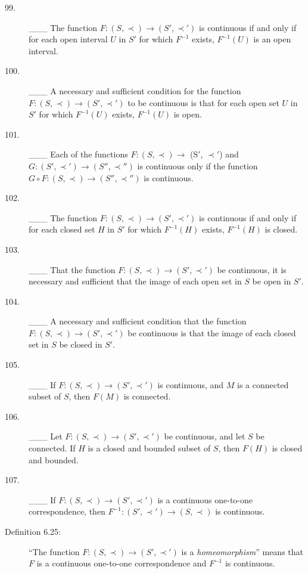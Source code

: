 \documentclass{book}
\begin{document}
\begin{description}
\item[99.] \_\_\_ The function $F: (S, \prec) \rightarrow (S', \prec ')$ is continuous if and only if for each open interval $U$ in $S'$ for which $F^{-1}$ exists, $F^{-1}(U)$ is an open interval.

\item[100.] \_\_\_ A necessary and sufficient condition for the function $F: (S, \prec) \rightarrow  (S', \prec ')$ to be continuous is that for each open set $U$ in $S'$ for which $F^{-1}(U)$ exists, $F^{-1}(U)$ is open.

\item[101.] \_\_\_ Each of the functions $F: (S, \prec) \rightarrow $ (S$'$, $\prec '$) and $G: (S', \prec ') \rightarrow (S'', \prec '')$ is continuous only if the function $G \circ F: (S, \prec) \rightarrow (S'', \prec '')$ is continuous.

\item[102.] \_\_\_ The function $F: (S, \prec) \rightarrow (S', \prec ')$ is continuous if and only if for each closed set $H$ in $S'$ for which $F^{-1}(H)$ exists, $F^{-1}(H)$ is closed.

\item[103.] \_\_\_ That the function $F: (S, \prec) \rightarrow (S', \prec ')$ be continuous, it is necessary and sufficient that the image of each open set in $S$ be open in $S'$.

\item[104.] \_\_\_ A necessary and sufficient condition that the function $F: (S, \prec) \rightarrow (S', \prec ')$ be continuous is that the image of each closed set in $S$ be closed in $S'$.

\item[105.] \_\_\_ If $F: (S, \prec) \rightarrow (S', \prec ')$ is continuous, and $M$ is a connected subset of $S$, then $F(M)$ is connected.

\item[106.] \_\_\_ Let $F: (S, \prec) \rightarrow (S', \prec ')$ be continuous, and let $S$ be connected. If $H$ is a closed and bounded subset of $S$, then $F(H)$ is closed and bounded.

\item[107.] \_\_\_ If $F: (S, \prec) \rightarrow (S', \prec')$ is a continuous one-to-one correspondence, then $F^{-1}: (S', \prec ') \rightarrow (S, \prec)$ is continuous.

\item[Definition 6.25:] ``The function $F: (S, \prec) \rightarrow (S', \prec ')$ is a \emph{homeomorphism}'' means that $F$ is a continuous one-to-one correspondence and $F^{-1}$ is continuous.


\end{description}
\end{document}
